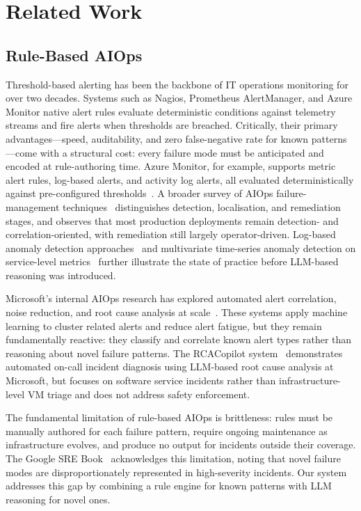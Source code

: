\documentclass[a4paper,10pt,journal,compsoc]{IEEEtran}
\begin{document}
\section{Related Work}

\subsection{Rule-Based AIOps}

Threshold-based alerting has been the backbone of IT operations
monitoring for over two decades. Systems such as Nagios, Prometheus
AlertManager, and Azure Monitor native alert rules evaluate
deterministic conditions against telemetry streams and fire alerts when
thresholds are breached. Critically, their primary advantages---speed,
auditability, and zero false-negative rate for known patterns---come
with a structural cost: every failure mode must be anticipated and
encoded at rule-authoring time. Azure Monitor, for example, supports
metric alert rules, log-based alerts, and activity log alerts, all
evaluated deterministically against pre-configured
thresholds~\cite{microsoft2024azuremonitor}. A broader survey of AIOps
failure-management techniques~\cite{notaro2021aiops} distinguishes
detection, localisation, and remediation stages, and observes that most
production deployments remain detection- and correlation-oriented, with
remediation still largely operator-driven. Log-based anomaly
detection approaches~\cite{shi2021log} and multivariate time-series
anomaly detection on service-level metrics~\cite{ma2021jumpstarting}
further illustrate the state of practice before LLM-based reasoning
was introduced.

Microsoft's internal AIOps research has explored automated alert
correlation, noise reduction, and root cause analysis at
scale~\cite{ahmed2023rootcause,xu2024xlifecycle}. These systems apply
machine learning to cluster related alerts and reduce alert fatigue,
but they remain fundamentally reactive: they classify and correlate
known alert types rather than reasoning about novel failure patterns.
The RCACopilot system~\cite{chen2024rcacopilot}
demonstrates automated on-call incident diagnosis using LLM-based root
cause analysis at Microsoft, but focuses on software service incidents
rather than infrastructure-level VM triage and does not address safety
enforcement.

The fundamental limitation of rule-based AIOps is brittleness: rules
must be manually authored for each failure pattern, require ongoing
maintenance as infrastructure evolves, and produce no output for
incidents outside their coverage. The Google SRE
Book~\cite{beyer2016sre} acknowledges this limitation, noting that
novel failure modes are disproportionately represented in
high-severity incidents. Our system addresses this gap by combining a
rule engine for known patterns with LLM reasoning for novel ones.
\end{document}
